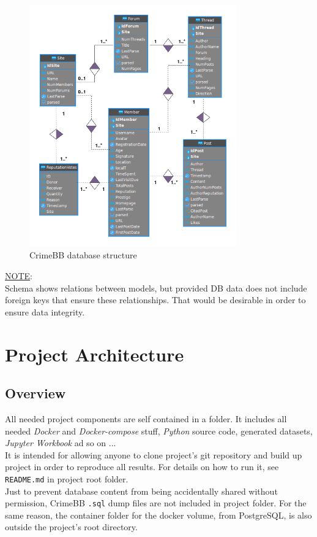 \begin{figure}[H]
	\centering
	\includegraphics[width=0.8\textwidth]{figs/crimebb.png}
	\caption{CrimeBB database structure}
	\label{fig:crimebb_structure}
\end{figure}

\noindent
\underline{NOTE}: \\
Schema shows relations between models, but provided DB data does not include foreign keys that ensure these relationships. That would be desirable in order to ensure data integrity.
\newpage

\section{Project Architecture}

\subsection{Overview}

All needed project components are self contained in a folder. It includes all needed \textit{Docker} and \textit{Docker-compose} stuff, \textit{Python} source code, generated datasets, \textit{Jupyter Workbook} ad so on ... \\
It is intended for allowing anyone to clone project's git repository and build up project in order to reproduce all results. For details on how to run it, see \texttt{README.md} in project root folder. \\
Just to prevent database content from being accidentally shared without permission, CrimeBB \texttt{.sql} dump files are not included in project folder. For the same reason, the container folder for the docker volume, from PostgreSQL, is also outside the project's root directory.

